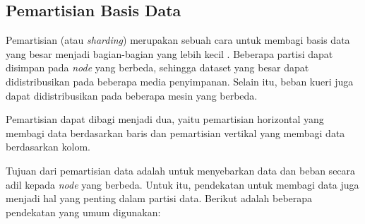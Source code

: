 \subsection{Pemartisian Basis Data}

Pemartisian (atau \textit{sharding}) merupakan sebuah cara untuk membagi basis data yang besar menjadi bagian-bagian yang lebih kecil \parencite{dataIntensiveApplications}. Beberapa partisi dapat disimpan pada \textit{node} yang berbeda, sehingga dataset yang besar dapat didistribusikan pada beberapa media penyimpanan. Selain itu, beban kueri juga dapat didistribusikan pada beberapa mesin yang berbeda.

Pemartisian dapat dibagi menjadi dua, yaitu pemartisian horizontal yang membagi data berdasarkan baris dan pemartisian vertikal yang membagi data berdasarkan kolom.

Tujuan dari pemartisian data adalah untuk menyebarkan data dan beban secara adil kepada \textit{node} yang berbeda. Untuk itu, pendekatan untuk membagi data juga menjadi hal yang penting dalam partisi data. Berikut adalah beberapa pendekatan yang umum digunakan:

